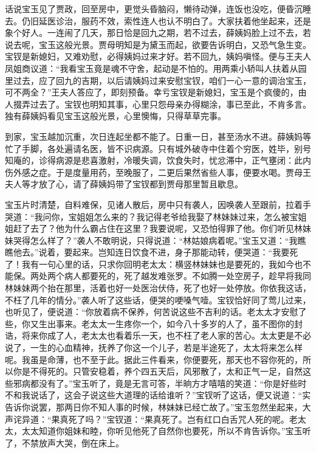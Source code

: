 


\begin{parag}
    话说宝玉见了贾政，回至房中，更觉头昏脑闷，懒待动弹，连饭也没吃，便昏沉睡去。仍旧延医诊治，服药不效，索性连人也认不明白了。大家扶着他坐起来，还是象个好人。一连闹了几天，那日恰是回九之期，若不过去，薛姨妈脸上过不去，若说去呢，宝玉这般光景。贾母明知是为黛玉而起，欲要告诉明白，又恐气急生变。宝钗是新媳妇，又难劝慰，必得姨妈过来才好。若不回九，姨妈嗔怪。便与王夫人凤姐商议道：“我看宝玉竟是魂不守舍，起动是不怕的。用两乘小轿叫人扶着从园里过去，应了回九的吉期，以后请姨妈过来安慰宝钗，咱们一心一意的调治宝玉，可不两全？”王夫人答应了，即刻预备。幸亏宝钗是新媳妇，宝玉是个疯傻的，由人掇弄过去了。宝钗也明知其事，心里只怨母亲办得糊涂，事已至此，不肯多言。独有薛姨妈看见宝玉这般光景，心里懊悔，只得草草完事。
\end{parag}


\begin{parag}
    到家，宝玉越加沉重，次日连起坐都不能了。日重一日，甚至汤水不进。薛姨妈等忙了手脚，各处遍请名医，皆不识病源。只有城外破寺中住着个穷医，姓毕，别号知庵的，诊得病源是悲喜激射，冷暖失调，饮食失时，忧忿滞中，正气壅闭：此内伤外感之症。于是度量用药，至晚服了，二更后果然省些人事，便要水喝。贾母王夫人等才放了心，请了薛姨妈带了宝钗都到贾母那里暂且歇息。
\end{parag}


\begin{parag}
    宝玉片时清楚，自料难保，见诸人散后，房中只有袭人，因唤袭人至跟前，拉着手哭道：“我问你，宝姐姐怎么来的？我记得老爷给我娶了林妹妹过来，怎么被宝姐姐赶了去了？他为什么霸占住在这里？我要说呢，又恐怕得罪了他。你们听见林妹妹哭得怎么样了？”袭人不敢明说，只得说道：“林姑娘病着呢。”宝玉又道：“我瞧瞧他去。”说着，要起来。岂知连日饮食不进，身子那能动转，便哭道：“我要死了！我有一句心里的话，只求你回明老太太：横竖林妹妹也是要死的，我如今也不能保。两处两个病人都要死的，死了越发难张罗。不如腾一处空房子，趁早将我同林妹妹两个抬在那里，活着也好一处医治伏侍，死了也好一处停放。你依我这话，不枉了几年的情分。”袭人听了这些话，便哭的哽嗓气噎。宝钗恰好同了莺儿过来，也听见了，便说道：“你放着病不保养，何苦说这些不吉利的话。老太太才安慰了些，你又生出事来。老太太一生疼你一个，如今八十多岁的人了，虽不图你的封诰，将来你成了人，老太太也看着乐一天，也不枉了老人家的苦心。太太更是不必说了，一生的心血精神，抚养了你这一个儿子，若是半途死了，太太将来怎么样呢。我虽是命薄，也不至于此。据此三件看来，你便要死，那天也不容你死的，所以你是不得死的。只管安稳着，养个四五天后，风邪散了，太和正气一足，自然这些邪病都没有了。”宝玉听了，竟是无言可答，半晌方才嘻嘻的笑道：“你是好些时不和我说话了，这会子说这些大道理的话给谁听？”宝钗听了这话，便又说道：“实告诉你说罢，那两日你不知人事的时候，林妹妹已经亡故了。”宝玉忽然坐起来，大声诧异道：“果真死了吗？”宝钗道：“果真死了。岂有红口白舌咒人死的呢。老太太，太太知道你姐妹和睦，你听见他死了自然你也要死，所以不肯告诉你。”宝玉听了，不禁放声大哭，倒在床上。
\end{parag}


